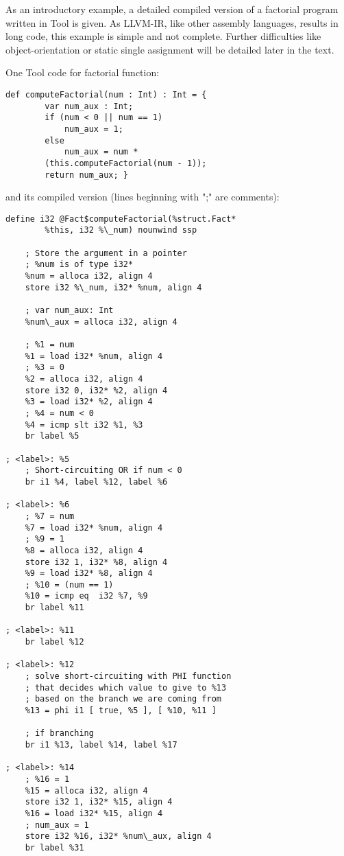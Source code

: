 As an introductory example, a detailed compiled version of a factorial program written in Tool is given. As LLVM-IR, like other assembly languages, results in long code, this example is simple and not complete. Further difficulties like object-orientation or static single assignment will be detailed later in the text.

One Tool code for factorial function:
\begin{lstlisting}
def computeFactorial(num : Int) : Int = {
        var num_aux : Int;
        if (num < 0 || num == 1)
            num_aux = 1;
        else
            num_aux = num * 
		(this.computeFactorial(num - 1));
        return num_aux; }
\end{lstlisting}
and its compiled version (lines beginning with ";" are comments):
\begin{verbatim}
define i32 @Fact$computeFactorial(%struct.Fact* 
        %this, i32 %\_num) nounwind ssp
    
    ; Store the argument in a pointer
    ; %num is of type i32*
    %num = alloca i32, align 4
    store i32 %\_num, i32* %num, align 4

    ; var num_aux: Int
    %num\_aux = alloca i32, align 4

    ; %1 = num
    %1 = load i32* %num, align 4
    ; %3 = 0
    %2 = alloca i32, align 4
    store i32 0, i32* %2, align 4
    %3 = load i32* %2, align 4
    ; %4 = num < 0
    %4 = icmp slt i32 %1, %3
    br label %5
    
; <label>: %5
    ; Short-circuiting OR if num < 0
    br i1 %4, label %12, label %6
    
; <label>: %6
    ; %7 = num
    %7 = load i32* %num, align 4
    ; %9 = 1
    %8 = alloca i32, align 4
    store i32 1, i32* %8, align 4
    %9 = load i32* %8, align 4
    ; %10 = (num == 1)
    %10 = icmp eq  i32 %7, %9
    br label %11
    
; <label>: %11
    br label %12
    
; <label>: %12
    ; solve short-circuiting with PHI function
    ; that decides which value to give to %13
    ; based on the branch we are coming from
    %13 = phi i1 [ true, %5 ], [ %10, %11 ]

    ; if branching
    br i1 %13, label %14, label %17
    
; <label>: %14
    ; %16 = 1
    %15 = alloca i32, align 4
    store i32 1, i32* %15, align 4
    %16 = load i32* %15, align 4
    ; num_aux = 1
    store i32 %16, i32* %num\_aux, align 4
    br label %31
    

\end{verbatim}
